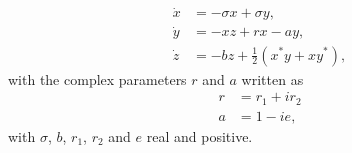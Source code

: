 \documentclass{article}
\begin{document}
\begin{preview}
\begin{align*}
\dot{x} &= -\sigma x + \sigma y, \\
\dot{y} &= -xz + rx -ay, \\
\dot{z} &= -bz + \frac{1}{2}(x^*y+xy^*), 
\end{align*}
with the complex parameters $r$ and $a$ written as 
\begin{align*}
r&=r_1+i r_2 \\
a&=1-ie,
\end{align*}
with $\sigma$, $b$, $r_1$, $r_2$ and $e$ real and positive.
\end{preview}
\end{document}
